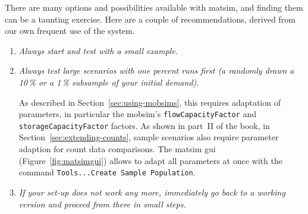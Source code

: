 


There are many options and possibilities available with \gls{matsim}, and finding them can be a taunting exercise.  Here are a couple of recommendations, derived from our own frequent use of the system.
\begin{enumerate}\styleEnumerate

\item \emph{Always start and test with a small example.}

\item \emph{Always test large scenarios with one percent runs first (\eg a randomly drawn a 10\,\% or a 1\,\% subsample of your initial demand).} 

As described in Section~\ref{sec:using-mobsims}, this requires adaptation of parameters, in particular the \gls{mobsim}'s \lstinline|flowCapacityFactor| and \lstinline|storageCapacityFactor| factors. As shown in part~II of the book, in Section~\ref{sec:extending-counts}, sample scenarios also require parameter adaption for count data comparisons. The \gls{matsim} \gls{gui} (Figure~\ref{fig:matsimgui}) allows to adapt all parameters at once with the command \lstinline|Tools...Create Sample Population|. %



\item \emph{If your set-up does not work any more, \emph{immediately} go back to a working version and proceed from there in small steps.}


\end{enumerate}
